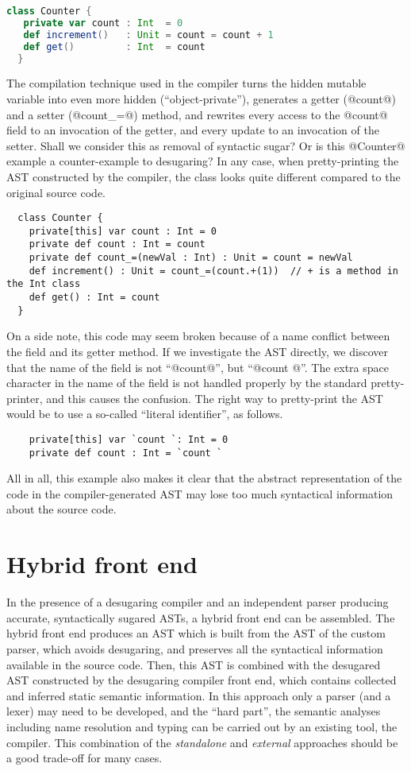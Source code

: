 \documentclass[11pt]{amsart}
\begin{document}
\begin{lstlisting}[language=scala]
  class Counter {
   private var count : Int  = 0
   def increment()   : Unit = count = count + 1
   def get()         : Int  = count
  }
\end{lstlisting}
The compilation technique used in the compiler turns the hidden mutable variable into even more hidden (``object-private''),
generates a getter (@count@) and a setter (@count_=@) method,
and rewrites every access to the @count@ field to an invocation of the getter, and every update
to an invocation of the setter. Shall we consider this as removal of syntactic sugar? Or is
this @Counter@ example a counter-example to desugaring? In any case, when pretty-printing the
AST constructed by the compiler, the class looks quite different compared to the original source code.
\begin{lstlisting}
  class Counter {
    private[this] var count : Int = 0
    private def count : Int = count
    private def count_=(newVal : Int) : Unit = count = newVal
    def increment() : Unit = count_=(count.+(1))  // + is a method in the Int class
    def get() : Int = count
  }  
\end{lstlisting}
On a side note,
this code may seem broken because of a name conflict between the field and its getter method.
If we investigate the AST directly, we discover that the name of the field is not ``@count@'', but
``@count @''. The extra space character in the name of the field is not handled properly by the
standard pretty-printer, and this causes the confusion. The right way to pretty-print the AST would be
to use a so-called ``literal identifier'', as follows.
\begin{lstlisting}
    private[this] var `count `: Int = 0
    private def count : Int = `count `
\end{lstlisting}
All in all, this example also makes it clear that the abstract representation of the code
in the compiler-generated AST may lose too much syntactical information about the source code.

\section{Hybrid front end}
\label{sec:hybrid}

In the presence of a desugaring compiler and an independent parser producing
accurate, syntactically sugared ASTs, a hybrid front end can be
assembled. %
%
The hybrid front end produces an AST which is built from the AST of
the custom parser, which avoids desugaring, and preserves all the
syntactical information available in the source code. Then, this
AST is combined with the desugared AST constructed by the desugaring
compiler front end, which contains collected and inferred static
semantic information. In this approach only a parser
(and a lexer) may need to be developed, and the ``hard part'', the
semantic analyses including name resolution and typing can be carried
out by an existing tool, the compiler. This combination of the
\emph{standalone} and \emph{external} approaches should be a good
trade-off for many cases. 
\end{document}
